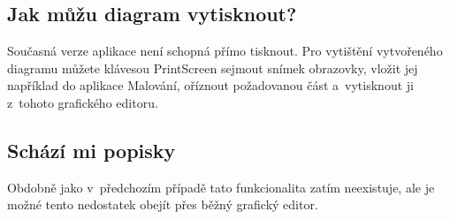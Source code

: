 \documentclass[12pt,oneside,a4paper,titlepage,final]{article}
\theoremstyle{note}
\begin{document}
\subsection{Jak můžu diagram vytisknout?}
Současná verze aplikace není schopná přímo tisknout. Pro vytištění vytvořeného diagramu můžete klávesou PrintScreen sejmout snímek obrazovky, vložit jej například do aplikace Malování, oříznout požadovanou část a~vytisknout ji z~tohoto grafického editoru.

\subsection{Schází mi popisky}
Obdobně jako v~předchozím případě tato funkcionalita zatím neexistuje, ale je možné tento nedostatek obejít přes běžný grafický editor.
\end{document}
